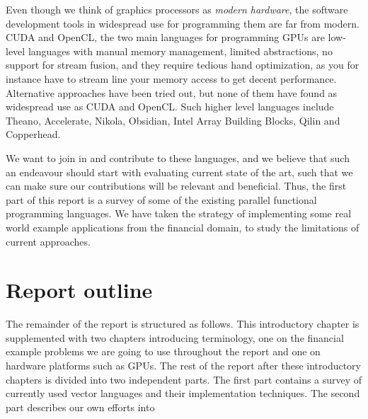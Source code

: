 Even though we think of graphics processors as \textit{modern
  hardware}, the software development tools in widespread use for
programming them are far from modern. CUDA and OpenCL, the two main
languages for programming GPUs are low-level languages with manual
memory management, limited abstractions, no support for stream fusion,
and they require tedious hand optimization, as you for instance have
to stream line your memory access to get decent
performance. Alternative approaches have been tried out, but none of
them have found as widespread use as CUDA and OpenCL. Such higher
level languages include Theano, Accelerate, Nikola, Obsidian, Intel
Array Building Blocks, Qilin and Copperhead.


We want to join in and contribute to these languages, and we believe
that such an endeavour should start with evaluating current state of
the art, such that we can make sure our contributions will be relevant
and beneficial. Thus, the first part of this report is a survey of
some of the existing parallel functional programming languages. We
have taken the strategy of implementing some real world example
applications from the financial domain, to study the limitations of
current approaches.



\section{Report outline}
The remainder of the report is structured as follows. This
introductory chapter is supplemented with two chapters introducing
terminology, one on the financial example problems we are going to use
throughout the report and one on hardware platforms such as GPUs. The
rest of the report after these introductory chapters is divided into
two independent parts. The first part contains a survey of currently
used vector languages and their implementation techniques. The second
part describes our own efforts into \todo{\ldots}

